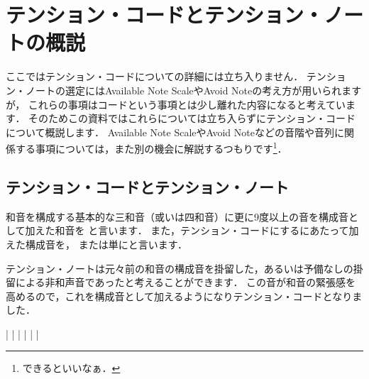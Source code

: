 \documentclass[dvipdfmx,uplatex,b5paper,openany,jbase=12Q,nomag*,textwidth-limit=44%
               ]{gachimuchi}
\begin{document}

\chapter{テンション・コードとテンション・ノートの概説}
\begin{Yodan}
ここではテンション・コードについての詳細には立ち入りません．
テンション・ノートの選定にはAvailable Note ScaleやAvoid Noteの考え方が用いられますが，
これらの事項はコードという事項とは少し離れた内容になると考えています．
そのためこの資料ではこれらについては立ち入らずにテンション・コードについて概説します．
Available Note ScaleやAvoid Noteなどの音階や音列に関係する事項については，また別の機会に解説するつもりです\footnote{
  できるといいなぁ．
}．
\end{Yodan}

\section{テンション・コードとテンション・ノート}
和音を構成する基本的な三和音（或いは四和音）に更に9度以上の音を構成音として加えた和音を
と言います．
また，テンション・コードにするにあたって加えた構成音を，
または単にと言います．

テンション・ノートは元々前の和音の構成音を掛留した，あるいは予備なしの掛留による非和声音であったと考えることができます．
この音が和音の緊張感を高めるので，これを構成音として加えるようになりテンション・コードとなりました．

\begin{Music}[.6\linewidth]
  \generalmeter{\meterC}%
  \Startpiece
  \NOTEs%
  |%
  \en\bar%
  \NOTEs%
  |%
  \en\doublebar%
  \NOTEs%
  |%
  \en%
  \bar%
  \NOTes%
  |%
  \en\setdoublebar%
  \endpiece
\end{Music}
\end{document}
